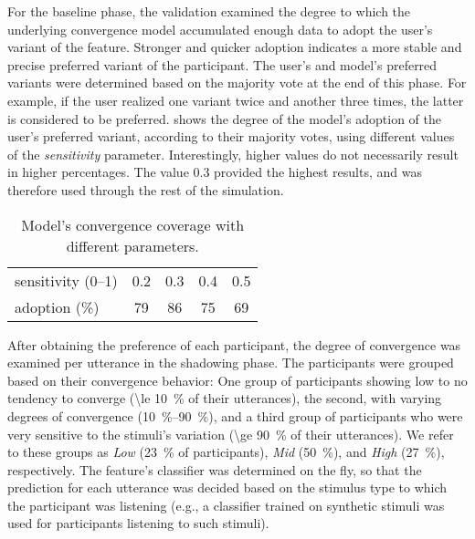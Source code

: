 For the baseline phase, the validation examined the degree to which the underlying convergence model accumulated enough data to adopt the user's variant of the feature.
Stronger and quicker adoption indicates a more stable and precise preferred variant of the participant.
The user's and model's preferred variants were determined based on the majority vote at the end of this phase.
For example, if the user realized one variant twice and another three times, the latter is considered to be preferred.
 shows the degree of the model's adoption of the user's preferred variant, according to their majority votes, using different values of the \emph{sensitivity} parameter.
Interestingly, higher values do not necessarily result in higher percentages.
The value 0.3 provided the highest results, and was therefore used through the rest of the simulation.

\begin{table}[t]
	\centering
	\begin{tabularx}{\linewidth}{X*{4}{S[table-format=2.1]}}
		\toprule
		sensitivity (\numrange{0}{1}) &  0.2 &  0.3 &  0.4 &  0.5 \\
		adoption (\si{\percent})      & 79   & 86   & 75   & 69   \\
		\bottomrule
	\end{tabularx}
	\caption{Model's convergence coverage with different parameters.}
	\label{tab:validation_baseline}
\end{table}

After obtaining the preference of each participant, the degree of convergence was examined per utterance in the shadowing phase.
The participants were grouped based on their convergence behavior:
One group of participants showing low to no tendency to converge (\SI{\le 10}{\percent} of their utterances),
the second, with varying degrees of convergence (\SIrange{10}{90}{\percent}),
and a third group of participants who were very sensitive to the stimuli's variation (\SI{\ge 90}{\percent} of their utterances).
We refer to these groups as \emph{Low} (\SI{23}{\percent} of participants), \emph{Mid} (\SI{50}{\percent}), and \emph{High} (\SI{27}{\percent}), respectively.
The feature's classifier was determined on the fly, so that the prediction for each utterance was decided based on the stimulus type to which the participant was listening (e.g., a classifier trained on synthetic stimuli was used for participants listening to such stimuli).

